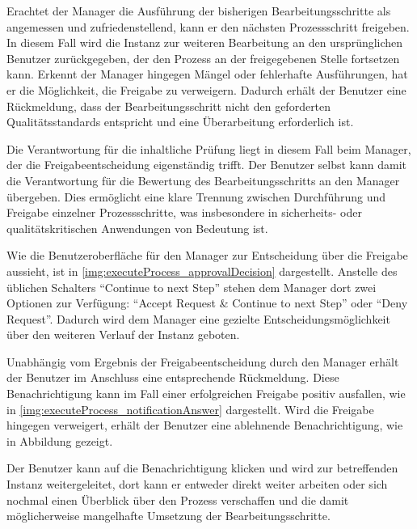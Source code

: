 
Erachtet der Manager die Ausführung der bisherigen Bearbeitungsschritte als angemessen und zufriedenstellend, kann er den nächsten Prozessschritt freigeben. In diesem Fall wird die Instanz zur weiteren Bearbeitung an den ursprünglichen Benutzer zurückgegeben, der den Prozess an der freigegebenen Stelle fortsetzen kann. Erkennt der Manager hingegen Mängel oder fehlerhafte Ausführungen, hat er die Möglichkeit, die Freigabe zu verweigern. Dadurch erhält der Benutzer eine Rückmeldung, dass der Bearbeitungsschritt nicht den geforderten Qualitätsstandards entspricht und eine Überarbeitung erforderlich ist.

Die Verantwortung für die inhaltliche Prüfung liegt in diesem Fall beim Manager, der die Freigabeentscheidung eigenständig trifft. Der Benutzer selbst kann damit die Verantwortung für die Bewertung des Bearbeitungsschritts an den Manager übergeben. Dies ermöglicht eine klare Trennung zwischen Durchführung und Freigabe einzelner Prozessschritte, was insbesondere in sicherheits- oder qualitätskritischen Anwendungen von Bedeutung ist.

Wie die Benutzeroberfläche für den Manager zur Entscheidung über die Freigabe aussieht, ist in \autoref{img:executeProcess_approvalDecision} dargestellt. Anstelle des üblichen Schalters \enquote{Continue to next Step} stehen dem Manager dort zwei Optionen zur Verfügung: \enquote{Accept Request \& Continue to next Step} oder \enquote{Deny Request}. Dadurch wird dem Manager eine gezielte Entscheidungsmöglichkeit über den weiteren Verlauf der Instanz geboten.


Unabhängig vom Ergebnis der Freigabeentscheidung durch den Manager erhält der Benutzer im Anschluss eine entsprechende Rückmeldung. Diese Benachrichtigung kann im Fall einer erfolgreichen Freigabe positiv ausfallen, wie in \autoref{img:executeProcess_notificationAnswer} dargestellt. Wird die Freigabe hingegen verweigert, erhält der Benutzer eine ablehnende Benachrichtigung, wie in Abbildung gezeigt.



Der Benutzer kann auf die Benachrichtigung klicken und wird zur betreffenden Instanz weitergeleitet, dort kann er entweder direkt weiter arbeiten oder sich nochmal einen Überblick über den Prozess verschaffen und die damit möglicherweise mangelhafte Umsetzung der Bearbeitungsschritte.

